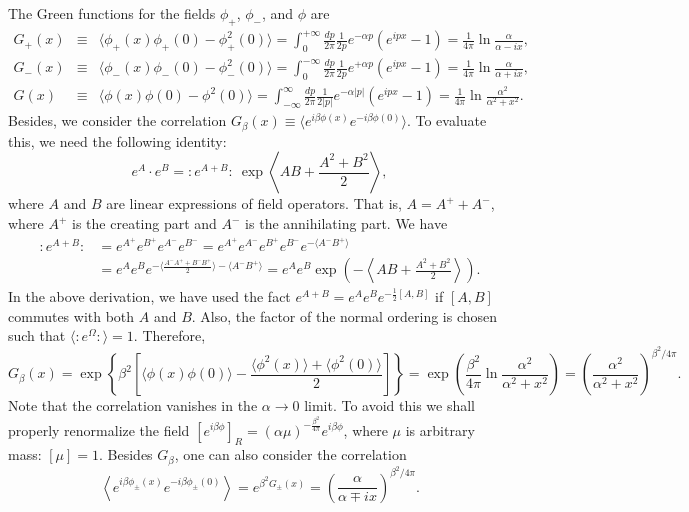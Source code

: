 \documentclass[aps,prb,superscriptaddress,nofootinbib]{revtex4}
\newcommand{\normord}[1]{{:\mathrel{#1}:}}
\begin{document}
The Green functions for the fields $\phi_+$, $\phi_-$, and $\phi$ are
\begin{eqnarray}
	G_+(x) &\equiv& \langle \phi_+(x)\phi_+(0)-\phi_+^2(0) \rangle 
	= \int_0^{+\infty} \frac{dp}{2\pi}\frac{1}{2p}e^{-\alpha p} \left(e^{ipx}-1\right)
	= \frac{1}{4\pi} \ln\frac{\alpha}{\alpha-ix}, \\
	G_-(x) &\equiv& \langle \phi_-(x)\phi_-(0)-\phi_-^2(0) \rangle 
	= \int_0^{-\infty} \frac{dp}{2\pi}\frac{1}{2p}e^{+\alpha p} \left(e^{ipx}-1\right)
	= \frac{1}{4\pi} \ln\frac{\alpha}{\alpha+ix}, \\
	G(x) &\equiv& \langle\phi(x)\phi(0)-\phi^2(0)\rangle 
	= \int_{-\infty}^{\infty} \frac{dp}{2\pi}\frac{1}{2|p|}e^{-\alpha |p|} \left(e^{ipx}-1\right)
	= \frac{1}{4\pi} \ln\frac{\alpha^2}{\alpha^2+x^2}.
\end{eqnarray}
Besides, we consider the correlation $G_\beta(x)\equiv\langle e^{i\beta\phi(x)} e^{-i\beta\phi(0)}\rangle$.
To evaluate this, we need the following identity:
\begin{equation}\label{eq:normord-id}
	e^A \cdot e^B = \normord{e^{A+B}} \ \exp\left\langle AB+\frac{A^2+B^2}{2}\right\rangle,
\end{equation}
where $A$ and $B$ are linear expressions of field operators.
That is, $A = A^+ + A^-$, where $A^+$ is the creating part and $A^-$ is the annihilating part.
We have
\begin{equation*}
\begin{aligned}
	\normord{e^{A+B}} &= e^{A^+} e^{B^+} e^{A^-} e^{B^-}
	= e^{A^+} e^{A^-} e^{B^+} e^{B^-} e^{-\langle A^- B^+\rangle} \\
	&= e^{A} e^{B} e^{-\langle\frac{A^-A^++B^-B^+}{2}\rangle-\langle A^- B^+\rangle}
	= e^{A} e^{B} \exp\left(-\left\langle AB+\frac{A^2+B^2}{2}\right\rangle\right).
\end{aligned}
\end{equation*}
In the above derivation, we have used the fact $e^{A+B}=e^A e^B e^{-\frac{1}{2}[A,B]}$ if $[A,B]$ commutes with both $A$ and $B$.
Also, the factor of the normal ordering is chosen such that $\langle\normord{e^{\Omega}}\rangle=1$.
Therefore,
\begin{equation}
	G_\beta(x) = \exp\left\{\beta^2\left[\langle\phi(x)\phi(0)\rangle-\frac{\langle\phi^2(x)\rangle+\langle\phi^2(0)\rangle}{2}\right]\right\}
	= \exp\left(\frac{\beta^2}{4\pi}\ln\frac{\alpha^2}{\alpha^2+x^2}\right)
	= \left(\frac{\alpha^2}{\alpha^2+x^2}\right)^{\beta^2/4\pi}.
\end{equation} 
Note that the correlation vanishes in the $\alpha \rightarrow 0$ limit.
To avoid this we shall properly renormalize the field $\left[e^{i\beta \phi}\right]_R = (\alpha\mu)^{-\frac{\beta^2}{4\pi}} e^{i\beta\phi}$, where $\mu$ is arbitrary mass: $[\mu]=1$.
Besides $G_\beta$, one can also consider the correlation
\begin{equation*}
	\left\langle e^{i\beta\phi_\pm(x)} e^{-i\beta\phi_\pm(0)} \right\rangle
	= e^{\beta^2 G_\pm(x)} = \left(\frac{\alpha}{\alpha\mp ix}\right)^{\beta^2/4\pi}.
\end{equation*}
\end{document}

